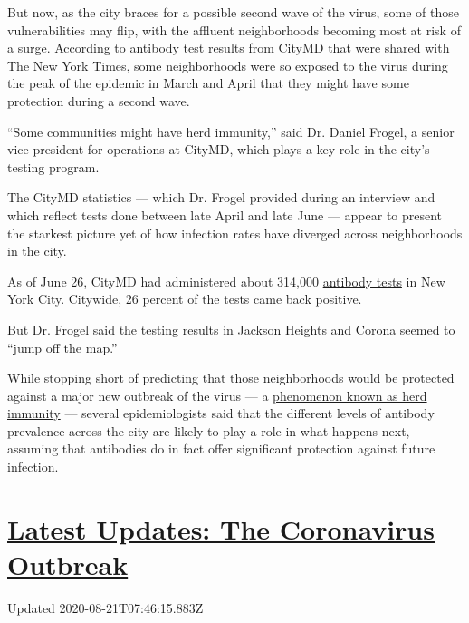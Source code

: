 But now, as the city braces for a possible second wave of the virus,
some of those vulnerabilities may flip, with the affluent neighborhoods
becoming most at risk of a surge. According to antibody test results
from CityMD that were shared with The New York Times, some neighborhoods
were so exposed to the virus during the peak of the epidemic in March
and April that they might have some protection during a second wave.

``Some communities might have herd immunity,'' said Dr. Daniel Frogel, a
senior vice president for operations at CityMD, which plays a key role
in the city's testing program.

The CityMD statistics --- which Dr. Frogel provided during an interview
and which reflect tests done between late April and late June --- appear
to present the starkest picture yet of how infection rates have diverged
across neighborhoods in the city.

As of June 26, CityMD had administered about 314,000
\href{https://www.nytimes3xbfgragh.onion/2020/08/19/nyregion/new-york-city-antibody-test.html}{antibody
tests} in New York City. Citywide, 26 percent of the tests came back
positive.

But Dr. Frogel said the testing results in Jackson Heights and Corona
seemed to ``jump off the map.''

While stopping short of predicting that those neighborhoods would be
protected against a major new outbreak of the virus --- a
\href{https://www.nytimes3xbfgragh.onion/interactive/2020/05/28/upshot/coronavirus-herd-immunity.html}{phenomenon
known as herd immunity} --- several epidemiologists said that the
different levels of antibody prevalence across the city are likely to
play a role in what happens next, assuming that antibodies do in fact
offer significant protection against future infection.

\hypertarget{latest-updates-the-coronavirus-outbreak}{%
\section{\texorpdfstring{\href{https://www.nytimes3xbfgragh.onion/2020/08/20/world/coronavirus-covid.html?action=click\&pgtype=Article\&state=default\&region=MAIN_CONTENT_1\&context=storylines_live_updates}{Latest
Updates: The Coronavirus
Outbreak}}{Latest Updates: The Coronavirus Outbreak}}\label{latest-updates-the-coronavirus-outbreak}}

Updated 2020-08-21T07:46:15.883Z

